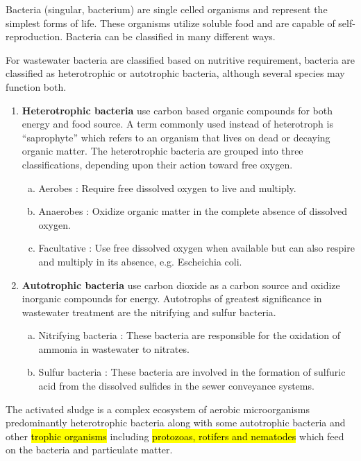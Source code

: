 Bacteria (singular, bacterium) are single celled organisms and represent the simplest forms of life.  These organisms utilize soluble food and are capable of self-reproduction.  
Bacteria can be classified in many different ways. 

For wastewater bacteria are classified based on nutritive requirement, bacteria are classified as heterotrophic or autotrophic bacteria, although several species may function both.

\begin{enumerate}[1.]
\item \textbf{Heterotrophic bacteria} use carbon based organic compounds for both energy and food source. A term commonly used instead of heterotroph is “saprophyte” which refers to an organism that lives on dead or decaying organic matter. The heterotrophic bacteria are grouped into three classifications, depending upon their action toward free oxygen.

\begin{enumerate}[a.]
\item
Aerobes : Require free dissolved oxygen to live and multiply. 
\item
Anaerobes : Oxidize organic matter in the complete absence of dissolved oxygen.
\item
Facultative : Use free dissolved oxygen when available but can also respire and multiply in its absence, e.g. Escheichia coli.
\end{enumerate}

\item \textbf{Autotrophic bacteria} use carbon dioxide as a carbon source and oxidize inorganic compounds for energy. Autotrophs of greatest significance in wastewater treatment are the nitrifying and sulfur bacteria.

\begin{enumerate}[a.]
\item Nitrifying bacteria : These bacteria are responsible for the oxidation of ammonia in wastewater to nitrates. 
\item Sulfur bacteria : These bacteria are involved in the formation of sulfuric acid from the dissolved sulfides in the sewer conveyance systems.
\end{enumerate}
\end{enumerate}

The activated sludge is a complex ecosystem of aerobic microorganisms predominantly heterotrophic bacteria along with some autotrophic bacteria and other \hl{trophic organisms} including \hl{protozoas, rotifers and nematodes} which feed on the bacteria and particulate matter.

